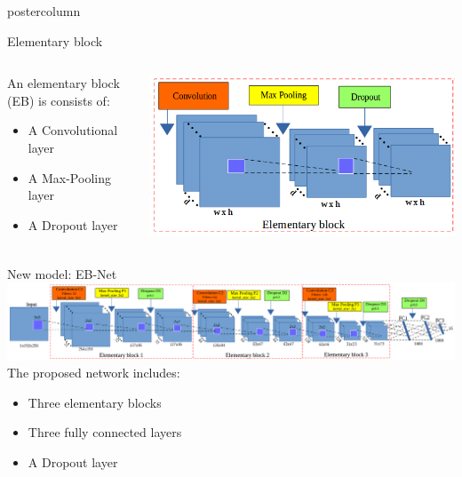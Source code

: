 \begin{frame}
\begin{columns}
\begin{column}{.53\textwidth}
\begin{beamercolorbox}[center,wd=\textwidth]{postercolumn}
\begin{minipage}[T]{.95\textwidth}
{            \vfill            
            \begin{block}{Elementary block}
            	\begin{columns}
            		\begin{column}{.45\textwidth}
            			An elementary block (EB) is consists of:
            			\begin{itemize}
            				\item A Convolutional layer
            				\item A Max-Pooling layer
            				\item A Dropout layer
            			\end{itemize}
            		\end{column}
            		\begin{column}{.44\textwidth}
            			\centering
            			\includegraphics[width=.85\textwidth]{images/elementary_block.png}
            		\end{column}
            	\end{columns}
            \end{block}
            
            \vfill            
            \begin{block}{New model: EB-Net}
            	\includegraphics[width=.90\textwidth]{images/arch_model.png}
            The proposed network includes:
            \begin{itemize}
            	\item Three elementary blocks
            	\item Three fully connected layers
            	\item A Dropout layer
            \end{itemize}
            \end{block}
  
}
\end{minipage}
\end{beamercolorbox}
\end{column}
\end{columns}
\end{frame}
